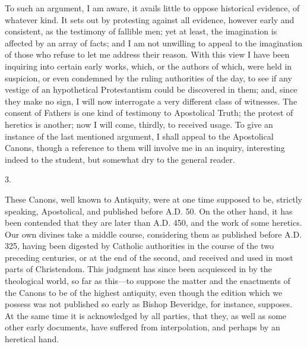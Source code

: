 To such an argument, I am aware, it avails little to oppose
historical evidence, of whatever kind. It sets out by protesting
against all evidence, however early and consistent, as the testimony
of fallible men; yet at least, the imagination is affected by an array
of facts; and I am not unwilling to appeal to the imagination of those
who refuse to let me address their reason. With this view I have been
inquiring into certain early works, which, or the authors of which,
were held in suspicion, or even condemned by the ruling authorities of
the day, to see if any vestige of an hypothetical Protestantism could
be discovered in them; and, since they make no sign, I will now
interrogate a very different class of witnesses. The consent of
Fathers is one kind of testimony to Apostolical Truth; the protest of
heretics is another; now I will come, thirdly, to received usage. To
give an instance of the last mentioned argument, I shall appeal to the
Apostolical Canons, though a reference to them will involve me in an
inquiry, interesting indeed to the student, but somewhat dry to the
general reader.

3.

These Canons, well known to Antiquity, were at one time supposed to
be, strictly speaking, Apostolical, and published before A.D.
50. On the other hand, it has been contended that they are later than A.D.
450, and the work of some heretics. Our own divines take a middle
course, considering them as published before A.D.
325, having been digested by Catholic authorities in the course of the
two preceding centuries, or at the end of the second, and
received and used in most parts of Christendom. This judgment has
since been acquiesced in by the theological world, so far as this—to
suppose the matter and the enactments of the Canons to be of the
highest antiquity, even though the edition which we possess was not
published so early as Bishop Beveridge, for instance, supposes. At the
same time it is acknowledged by all parties, that they, as well as
some other early documents, have suffered from interpolation, and
perhaps by an heretical hand.

